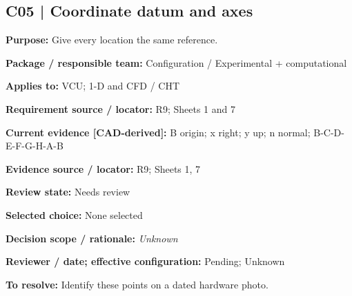 \documentclass[11pt]{article}
\begin{document}
\par\noindent\begin{minipage}{\textwidth}\small\setlength{\parskip}{2pt}
\subsection*{C05 | Coordinate datum and axes}
\textbf{Purpose:} Give every location the same reference.\par
\textbf{Package / responsible team:} Configuration / Experimental + computational\par
\textbf{Applies to:} VCU; 1-D and CFD / CHT\par
\textbf{Requirement source / locator:} R9; Sheets 1 and 7\par
\textbf{Current evidence [CAD-derived]:} B origin; x right; y up; n normal; B-C-D-E-F-G-H-A-B\par
\textbf{Evidence source / locator:} R9; Sheets 1, 7\par
\textbf{Review state:} Needs review\par
\textbf{Selected choice:} None selected\par
\textbf{Decision scope / rationale:} \textit{Unknown}\par
\textbf{Reviewer / date; effective configuration:} Pending; Unknown\par
\textbf{To resolve:} Identify these points on a dated hardware photo.\par
\end{minipage}\par\vspace{5pt}
\end{document}

